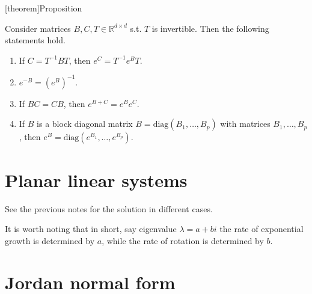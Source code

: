 \documentclass[12pt]{report}
\theoremstyle{definition}
\begin{document}
[theorem]{Proposition}
\begin{properties of the matrix exponential}
    Consider matrices $B,C,T\in\mathbb{R}^{d\times d}$ s.t. $T$ is invertible. 
    Then the following statements hold.
    \begin{enumerate}[label = (\roman*)]
        \item If $C=T^{-1}BT$, then $e^{C}=T^{-1}e^{B}T$.
        \item $e^{-B}={(e^{B})}^{-1}$.
        \item If $BC=CB$, then $e^{B+C}=e^{B}e^{C}$.
        \item If $B$ is a block diagonal matrix $B=\text{diag}(B_1,\ldots,B_p)$
            with matrices $B_1,\ldots,B_p$, then
            $e^{B}=\text{diag}(e^{B_1},\ldots,e^{B_p})$.
    \end{enumerate} 
\end{properties of the matrix exponential}

\section{Planar linear systems}

See the previous notes for the solution in different cases.

It is worth noting that in short, say eigenvalue $\lambda=a+bi$
the rate of exponential growth is determined by $a$, 
while the rate of rotation is determined by $b$.

\section{Jordan normal form}
\end{document}

